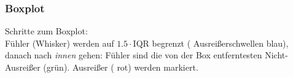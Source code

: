 \subsubsection*{Boxplot}
Schritte zum Boxplot:\\
Fühler (Whisker) werden auf $1.5\cdot\textrm{IQR}$ begrenzt ({\color{blue} Ausreißerschwellen blau}),
danach nach \textit{\color{FarnFarbe}innen} gehen: Fühler sind die von der Box
entferntesten Nicht-Ausreißer ({\color{FarnFarbe}grün}). Ausreißer
({\color{red} rot}) werden markiert.

\hrulefill

